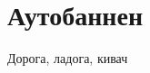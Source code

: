 \chapter{Аутобаннен}
\vepsianrose
\fancyhead[LE]{\fancyplain{}{\bfseries \parttitle}}
\fancyhead[RO]{\fancyplain{}{\bfseries \rightmark}}

Дорога, ладога, кивач

\begin{center}
\end{center}